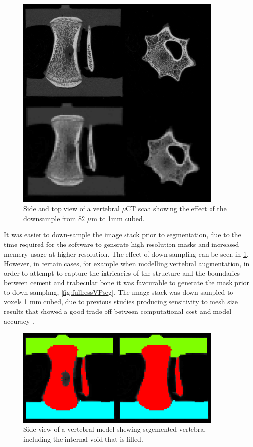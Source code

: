 \begin{figure}[ht!]
\centering
  \includegraphics[width=4in]{images/compofDownsample.png}
  \caption{Side and top view of a vertebral $\mu$CT scan showing the effect of the downsample from 82 $\mu$m to 1mm cubed.}
\label{fig:compofDownsample}
\end{figure}




It was easier to down-sample the image stack prior to
segmentation, due to the time required for the software to generate
high resolution masks and increased memory usage at higher resolution. The effect of down-sampling can be seen in \cref{fig:compofDownsample}. However, in certain cases, for example when
modelling vertebral augmentation, in order to attempt to capture the
intricacies of the structure and the boundaries between cement and
trabecular bone it was favourable to generate the mask prior to down
sampling, \cref{fig:fullressVPseg}. The image stack was down-sampled to voxels 1 mm cubed, due to
previous studies producing sensitivity to mesh size results that showed
a good trade off between computational cost and model accuracy \cite{Jones2007}.



\begin{figure}[ht!]
\centering
  \includegraphics[width=4in]{images/fillTheVoid.png}
  \caption{Side view of a vertebral model showing segemented vertebra, including the internal void that is filled.}
\label{fig:fillTheVoid}
\end{figure}


